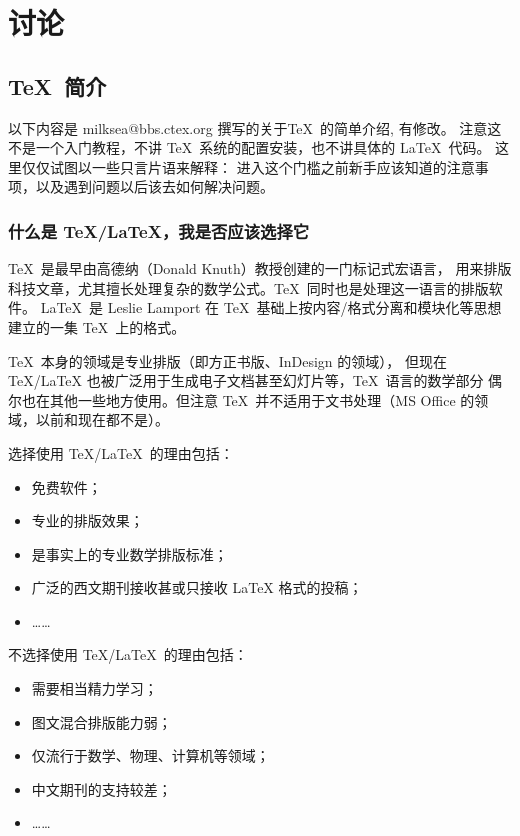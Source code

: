 
\chapter{讨论}



\section{\TeX\ 简介}

以下内容是 milksea@bbs.ctex.org 撰写的关于\TeX\ 的简单介绍, 有修改。
注意这不是一个入门教程，不讲 \TeX\ 系统的配置安装，也不讲具体的 \LaTeX\ 代码。
这里仅仅试图以一些只言片语来解释：
进入这个门槛之前新手应该知道的注意事项，以及遇到问题以后该去如何解决问题。

\subsection{什么是 \TeX/\LaTeX，我是否应该选择它}

\TeX\ 是最早由高德纳（Donald Knuth）教授创建的一门标记式宏语言，
用来排版科技文章，尤其擅长处理复杂的数学公式。\TeX\ 同时也是处理这一语言的排版软件。
\LaTeX\ 是 Leslie Lamport 在 \TeX\ 基础上按内容/格式分离和模块化等思想建立的一集 \TeX\ 上的格式。

\TeX\ 本身的领域是专业排版（即方正书版、InDesign 的领域），
但现在 TeX/LaTeX 也被广泛用于生成电子文档甚至幻灯片等，\TeX\ 语言的数学部分
偶尔也在其他一些地方使用。但注意 \TeX\ 并不适用于文书处理（MS Office 的领域，以前和现在都不是）。

选择使用 \TeX/\LaTeX\ 的理由包括：
\begin{itemize}
\item 免费软件；
\item 专业的排版效果；
\item 是事实上的专业数学排版标准；
\item 广泛的西文期刊接收甚或只接收 LaTeX 格式的投稿；
\item[] ……
\end{itemize}
不选择使用 \TeX/\LaTeX\ 的理由包括：
\begin{itemize}
\item 需要相当精力学习；
\item 图文混合排版能力弱；
\item 仅流行于数学、物理、计算机等领域；
\item 中文期刊的支持较差；
\item[] ……
\end{itemize}

